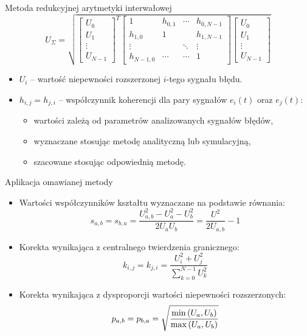 \documentclass[12pt, polish, aspectratio = 169]{slides}
\begin{document}
\begin{frame}{Metoda redukcyjnej arytmetyki interwałowej}
\begin{equation}
U_{\Sigma} = \sqrt{
\begin{bmatrix}
U_{0} \\ U_{1} \\ \vdots \\ U_{N-1}
\end{bmatrix}^{T}
\begin{bmatrix}
1         & h_{0,1} & \cdots & h_{0,N-1} \\
h_{1,0}   & 1       &        & h_{1,N-1} \\
\vdots    &         & \ddots & \vdots    \\
h_{N-1,0} & \cdots  & \cdots & 1
\end{bmatrix}
\begin{bmatrix}
U_{0} \\ U_{1} \\ \vdots \\ U_{N-1}
\end{bmatrix}}
\label{eq:unc_matrix}
\end{equation}
\begin{itemize}
\item $U_{i}$ -- wartość niepewności rozszerzonej $i$-tego sygnału błędu.
\item $h_{i,j} = h_{j,i}$ -- współczynnik koherencji dla pary sygnałów $e_{i}(t)$ oraz $e_{j}(t)$:
	\begin{itemize}
	\item wartości zależą od parametrów analizowanych sygnałów błędów,
	\item wyznaczane stosując metodę analityczną lub symulacyjną,
	\item szacowane stosując odpowiednią metodę.
	\end{itemize}
\end{itemize}
\end{frame}

\begin{frame}{Aplikacja omawianej metody}
\begin{itemize}
\item Wartości współczynników kształtu wyznaczane na podstawie równania:
\begin{equation}
s_{a,b} = s_{b,a} = \frac{U_{a,b}^{2} - U_{a}^{2} - U_{b}^{2}}{2 U_{a} U_{b}} = \frac{U^{2}}{2 U_{a,b}} - 1 \label{eq:unc_shapertwo}
\end{equation}
\item Korekta wynikająca z centralnego twierdzenia granicznego:
\begin{equation}
k_{i,j} = k_{j,i} = \frac{U_{i}^{2} + U_{j}^{2}}{\sum _{k = 0} ^{N-1} U_{k}^{2}} \label{eq:unc_cohercorrb}
\end{equation}
\item Korekta wynikająca z dysproporcji wartości niepewności rozszerzonych:
\begin{equation}
p_{a,b} = p_{b,a} = \sqrt{\frac{\min \left(U_{a}, U_{b}\right)}{\max \left(U_{a}, U_{b}\right)}} \label{eq:unc_cohercorra}
\end{equation}
\end{itemize}
\end{frame}
\end{document}
